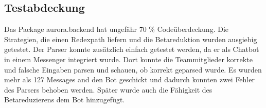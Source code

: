 \documentclass[parskip=full,11pt,twoside]{scrartcl}
\begin{document}
\subsection{Testabdeckung}
Das Package aurora.backend hat ungefähr 70 \% Codeüberdeckung.
Die Strategien, die einen Redexpath liefern und die Betareduktion wurden ausgiebig getestet.
Der Parser konnte zusätzlich einfach getestet werden, da er als Chatbot in einem Messenger integriert wurde.
Dort konnte die Teammitglieder korrekte und falsche Eingaben parsen und schauen,
ob korrekt geparsed wurde.
Es wurden mehr als 127 Messages and den Bot geschickt und dadurch konnten zwei
Fehler des Parsers behoben werden.
Später wurde auch die Fähigkeit des Betareduzierens dem Bot hinzugefügt.
\newpage
\end{document}

